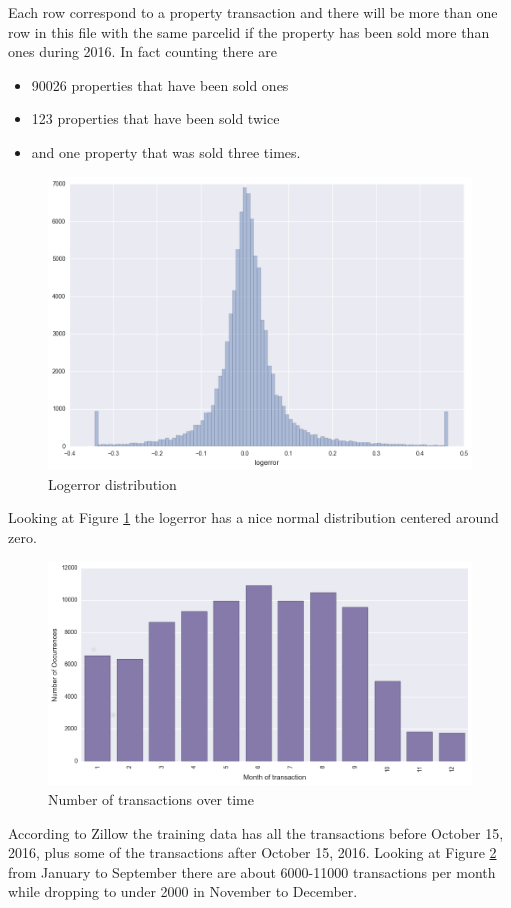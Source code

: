 \documentclass[a4paper]{article}
\begin{document}
Each row correspond to a property transaction and there will be more than one row in this file with the same parcelid if the property has been sold more than ones during 2016. In fact counting there are
\begin{itemize}
    \item 90026 properties that have been sold ones
    \item 123 properties that have been sold twice
    \item and one property that was sold three times.
\end{itemize}

\begin{figure}
\centering
\includegraphics[width=1\textwidth]{./img/train-logerror.png}
\caption{\label{fig:logerror}Logerror distribution}
\end{figure}
Looking at Figure \ref{fig:logerror} the logerror has a nice normal distribution centered around zero.

\begin{figure}
\centering
\includegraphics[width=1\textwidth]{./img/train-transactiondate.png}
\caption{\label{fig:transactions}Number of transactions over time}
\end{figure}
According to Zillow the training data has all the transactions before October 15, 2016, plus some of the transactions after October 15, 2016. Looking at Figure \ref{fig:transactions} from January to September there are about 6000-11000 transactions per month while dropping to under 2000 in November to December.
\end{document}
